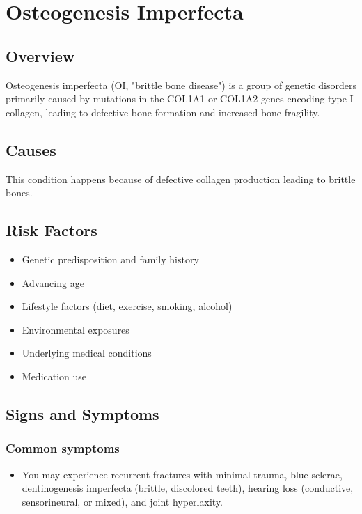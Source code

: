 \chapter{Osteogenesis Imperfecta}
\label{sec:Osteogenesis Imperfecta}

\section{Overview}
Osteogenesis imperfecta (OI, "brittle bone disease") is a group of genetic disorders primarily caused by mutations in the COL1A1 or COL1A2 genes encoding type I collagen, leading to defective bone formation and increased bone fragility.
\section{Causes}
This condition happens because of defective collagen production leading to brittle bones.     
\section{Risk Factors}

\begin{itemize}[noitemsep]
  \item Genetic predisposition and family history
  \item Advancing age
  \item Lifestyle factors (diet, exercise, smoking, alcohol)
  \item Environmental exposures
  \item Underlying medical conditions
  \item Medication use
\end{itemize}
\section{Signs and Symptoms}

\subsection{Common symptoms}
\begin{itemize}[noitemsep]
  \item You may experience recurrent fractures with minimal trauma, blue sclerae, dentinogenesis imperfecta (brittle, discolored teeth), hearing loss (conductive, sensorineural, or mixed), and joint hyperlaxity. 
  \end{itemize}

